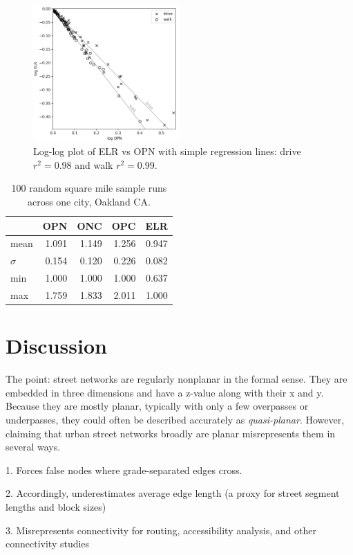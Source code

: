 \documentclass[Afour,sageh,times]{sagej}
\begin{document}
\begin{figure}[htbp]
    \center
    \includegraphics[width=0.5\textwidth]{regression_split.png}
    \caption{Log-log plot of ELR vs OPN with simple regression lines: drive $r^2=0.98$ and walk $r^2=0.99$.}
    \label{fig:regression_elr_opn}
\end{figure}





\begin{table}[htbp]
\centering
\caption{100 random square mile sample runs across one city, Oakland CA.}
\label{tab:samples_city}
\begin{tabular}{ l r r r r }
\toprule
         &  OPN   &  ONC   &  OPC   &  ELR   \\
\midrule
mean &                       1.091 &                        1.149 &                     1.256 &              0.947 \\
$\sigma$  &                       0.154 &                        0.120 &                     0.226 &              0.082 \\
min  &                       1.000 &                        1.000 &                     1.000 &              0.637 \\
max  &                       1.759 &                        1.833 &                     2.011 &              1.000 \\
\bottomrule
\end{tabular}
\end{table}


\section{Discussion}

The point: street networks are regularly nonplanar in the formal sense. They are embedded in three dimensions and have a z-value along with their x and y. Because they are mostly planar, typically with only a few overpasses or underpasses, they could often be described accurately as \emph{quasi-planar}. However, claiming that urban street networks broadly are planar misrepresents them in several ways.

1. Forces false nodes where grade-separated edges cross.

2. Accordingly, underestimates average edge length (a proxy for street segment lengths and block sizes)

3. Misrepresents connectivity for routing, accessibility analysis, and other connectivity studies



\end{document}
